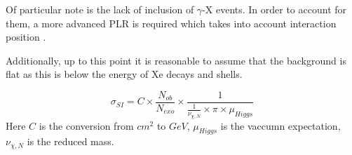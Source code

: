 \par
Of particular note is the lack of inclusion of $\gamma$-X events.
In order to account for them, a more advanced PLR is required which takes into account interaction position \cite{billyboxer_thesis_ref, LUX_RUN4_EFT_2021}.


\par
Additionally, up to this point it is reasonable to assume that the background is flat as this is below the energy of Xe decays and shells.



\begin{equation}
    \sigma_{SI} = C \times \frac{N_{ob}}{N_{exo}} \times \frac{1}{\frac{1}{\nu_{\chi,N}} \times \pi \times \mu_{Higgs}}
\end{equation}
Here $C$ is the conversion from $cm^{2}$ to $GeV$, $\mu_{Higgs}$ is the vaccumn expectation, $\nu_{\chi,N}$ is the reduced mass.

